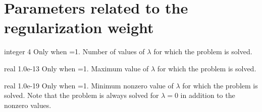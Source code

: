 \section{Parameters related to the regularization weight}

{integer}
{4}
{Only when =1.}
{Number of values of $\lambda$ for which the problem is solved.}

\myhrule

{real}
{1.0e-13}
{Only when =1.}
{Maximum value of $\lambda$ for which the problem is solved.}

\myhrule

{real}
{1.0e-19}
{Only when =1.}
{Minimum nonzero value of $\lambda$ for which the problem is solved.
Note that the problem is always solved for $\lambda=0$ in addition to
the nonzero values.}

